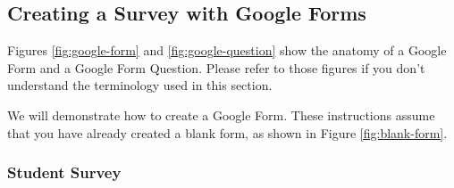 \subsection{Creating a Survey with Google Forms}
Figures \ref{fig:google-form} and \ref{fig:google-question} show the anatomy of a Google Form and a Google Form Question.  Please refer to those figures if you don't understand the terminology used in this section.

We will demonstrate how to create a Google Form.  These instructions assume that you have already created a blank form, as shown in Figure \ref{fig:blank-form}.


%
%
\subsubsection{Student Survey}

